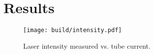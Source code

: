 \section{Results}
\label{sec:results}

\begin{figure*}
  \centering
  \texttt{[image: build/intensity.pdf]}
  \caption{Laser intensity measured vs. tube current.}
  \label{fig:intensity}
\end{figure*}


